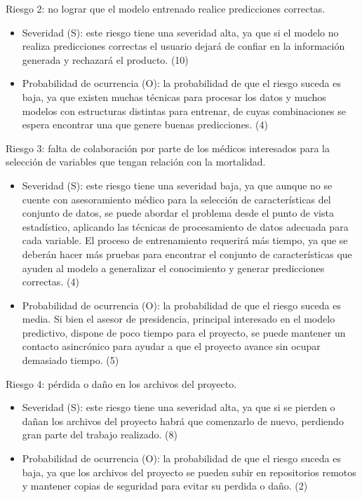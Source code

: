 \documentclass[
11pt, %
]{charter}
\begin{document}
Riesgo 2: no lograr que el modelo entrenado realice predicciones correctas.
\begin{itemize}
	\item Severidad (S): este riesgo tiene una severidad alta, ya que si el modelo no realiza predicciones correctas el usuario dejará de confiar en la información generada y rechazará el producto. (10)
	\item Probabilidad de ocurrencia (O): la probabilidad de que el riesgo suceda es baja, ya que existen muchas técnicas para procesar los datos y muchos modelos con estructuras distintas para entrenar, de cuyas combinaciones se espera encontrar una que genere buenas predicciones. (4)
\end{itemize} 

Riesgo 3: falta de colaboración por parte de los médicos interesados para la selección de variables que tengan relación con la mortalidad.
\begin{itemize}
	\item Severidad (S): este riesgo tiene una severidad baja, ya que aunque no se cuente con asesoramiento médico para la selección de características del conjunto de datos, se puede abordar el problema desde el punto de vista estadístico, aplicando las técnicas de procesamiento de datos adecuada para cada variable. El proceso de entrenamiento requerirá más tiempo, ya que se deberán hacer más pruebas para encontrar el conjunto de características que ayuden al modelo a generalizar el conocimiento y generar predicciones correctas. (4)
	\item Probabilidad de ocurrencia (O): la probabilidad de que el riesgo suceda es media. Si bien el asesor de presidencia, principal interesado en el modelo predictivo, dispone de poco tiempo para el proyecto, se puede mantener un contacto asincrónico para ayudar a que el proyecto avance sin ocupar demasiado tiempo. (5)
\end{itemize} 

Riesgo 4: pérdida o daño en los archivos del proyecto.
\begin{itemize}
	\item Severidad (S): este riesgo tiene una severidad alta, ya que si se pierden o dañan los archivos del proyecto habrá que comenzarlo de nuevo, perdiendo gran parte del trabajo realizado. (8)
	\item Probabilidad de ocurrencia (O): la probabilidad de que el riesgo suceda es baja, ya que los archivos del proyecto se pueden subir en repositorios remotos y mantener copias de seguridad para evitar su perdida o daño. (2)
\end{itemize} 
\end{document}

